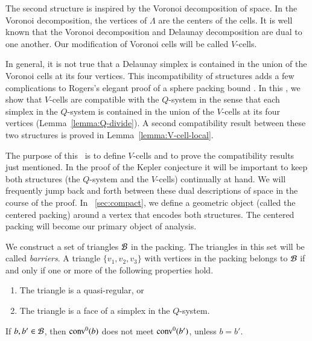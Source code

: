 The second structure is inspired by the Voronoi decomposition of
space. In the Voronoi decomposition, the vertices of $\Lambda$ are
the centers of the cells.  It is well known that the Voronoi
decomposition and Delaunay decomposition are dual to one another.
Our modification of Voronoi cells will be called $V$-cells.

In general, it is not true that a Delaunay simplex is contained in
the union of the Voronoi cells at its four vertices.  This
incompatibility of structures adds a few complications to Rogers's
elegant proof of a sphere packing bound \cite{Rog58}. In this
\chap, we show that $V$-cells are compatible with the $Q$-system
in the sense that each simplex in the  $Q$-system is contained in
the union of the $V$-cells at its four vertices
(Lemma~\ref{lemma:Q-divide}). A second compatibility result
between these two structures is proved in
Lemma~\ref{lemma:V-cell-local}.

The purpose of this \chap\ is to define $V$-cells and to prove the
compatibility results just mentioned.  In the proof of the Kepler
conjecture it will be important to keep both structures (the
$Q$-system and the $V$-cells) continually at hand. We will
frequently jump back and forth between these dual descriptions of
space in the course of the proof.  In \Chap~\ref{sec:compact}, we
define a geometric object (called the centered packing) around a
vertex that encodes both structures.  The centered packing will
become our primary object of analysis.



\begin{definition}\label{def:barrier}
We construct a set of triangles ${\mathcal B}$ in the packing.  The
triangles in this set will be called {\it barriers}.
A triangle $\{v_1,v_2,v_3\}$ with vertices in the packing belongs to
${\mathcal B}$ if and only if  one or more of the following properties
hold.
\begin{enumerate}
    \item The triangle is a
    quasi-regular, or
    \item The triangle is a face of a simplex in the $Q$-system.
\end{enumerate}
\end{definition}

\begin{lemma}\label{lemma:barrier-no-overlap} %
 If $b,b'\in {\mathcal B}$, then
${\operatorname{conv}}^0(b)$ does not meet ${\operatorname{conv}}^0(b')$, unless $b=b'$.
\end{lemma}

